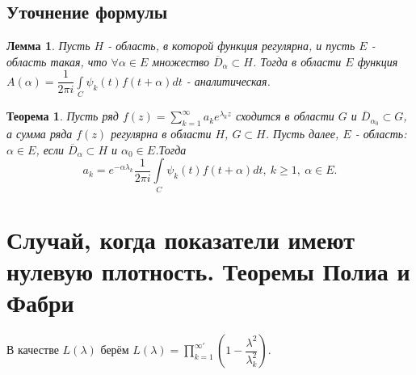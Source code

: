 \documentclass[9pt]{article}
\newtheorem{theorem}{Теорема} %
\newtheorem{lemma}{Лемма} %
\begin{document}
			\subsection{Уточнение формулы}
				\begin{lemma}
					Пусть $H$ - область, в которой функция регулярна, и пусть $E$ - область такая, что $\forall \alpha \in E$ множество $\overline{D}_\alpha \subset H$. Тогда в области $E$ функция  $A(\alpha)  = \dfrac{1}{2\pi i} \int\limits_{C} \psi_k(t) f(t + \alpha) dt $ - аналитическая.
				\end{lemma}
				\begin{theorem}
					Пусть ряд $f(z) = \sum\limits_{k=1}^{\infty} a_k e^{\lambda_k z}$ сходится в области $G$ и $\overline{D}_{\alpha_0} \subset G$, а сумма ряда $f(z)$ регулярна в области $H$, $G \subset H$. Пусть далее, $E$ - область: $\alpha \in E$, если $\overline{D}_\alpha \subset H$ и $\alpha_0 \in E$.Тогда
					$$
						a_k = e^{-\alpha \lambda_k} \dfrac{1}{2 \pi i} \int\limits_C \psi_k(t) f(t + \alpha) dt, \ k \geq 1, \ \alpha \in E.
					$$
				\end{theorem}
			\section{ Случай, когда показатели имеют нулевую плотность. Теоремы Полиа и Фабри}
				В качестве $L(\lambda)$ берём $L(\lambda) = \prod_{k=1}^{\infty'} (1 - \dfrac{\lambda^2}{\lambda^2_k})$.
				
\end{document}
